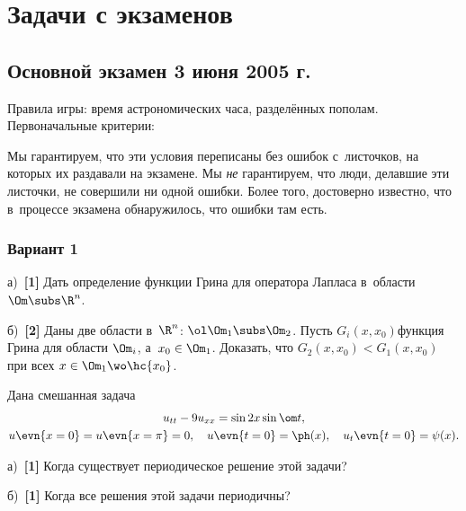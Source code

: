 \documentclass[a4paper]{article}
\def\s#1{~{\textbf{[#1]}}}
\begin{document}
\section{Задачи с экзаменов}

\subsection{Основной экзамен 3 июня 2005 г.}

Правила игры: время астрономических часа, разделённых пополам. Первоначальные критерии:

Мы гарантируем, что эти условия переписаны без ошибок с~листочков, на которых их раздавали
на экзамене. Мы \emph{не} гарантируем, что люди, делавшие эти листочки, не совершили ни одной ошибки.
Более того, достоверно известно, что в~процессе экзамена обнаружилось, что ошибки там есть.

\subsubsection{Вариант 1}
\setcounter{problem}{0}

\begin{problem}

а)\s1 Дать определение функции Грина для оператора Лапласа в~области $\Om \subs \R^n$.

б)\s2 Даны две области в~$\R^n$: $\ol\Om_1 \subs \Om_2$. Пусть $G_i(x,x_0)$\т функция Грина для области $\Om_i$,
а~$x_0 \in \Om_1$. Доказать, что $G_2(x,x_0) < G_1(x,x_0)$ при всех $x \in \Om_1 \wo \hc{x_0}$.
\end{problem}

\begin{problem}
Дана смешанная задача
\begin{gather*}
u_{tt}-9 u_{xx} = \sin 2x \sin \om t,\\
u\evn{x=0} = u\evn{x=\pi} = 0, \quad u\evn{t=0} = \ph(x), \quad u_t\evn{t=0} = \psi(x).
\end{gather*}

а)\s1 Когда существует периодическое решение этой задачи?

б)\s1 Когда все решения этой задачи периодичны?
\end{problem}
\end{document}
